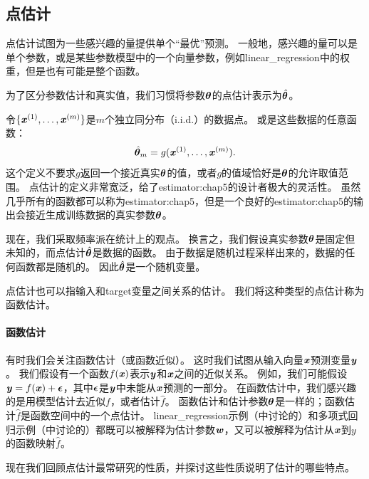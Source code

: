 \subsection{点估计}
\label{sec:point_estimation}
点估计试图为一些感兴趣的量提供单个``最优''预测。
一般地，感兴趣的量可以是单个参数，或是某些参数模型中的一个向量参数，例如\gls{linear_regression}中的权重，但是也有可能是整个函数。

为了区分参数估计和真实值，我们习惯将参数$\boldsymbol{\theta}$的点估计表示为$\hat{\boldsymbol{\theta}}$。

令$\{\boldsymbol{\mathit{x}}^{(1)},\dots,\boldsymbol{\mathit{x}}^{(m)}\}$是$m$个独立同分布（i.i.d.）的数据点。
或是这些数据的任意函数：
\begin{equation}
    \hat{\boldsymbol{\theta}}_m = g(\boldsymbol{\mathit{x}}^{(1)}, \dots, \boldsymbol{\mathit{x}}^{(m)}) .
\end{equation}
这个定义不要求$g$返回一个接近真实$\boldsymbol{\theta}$的值，或者$g$的值域恰好是$\boldsymbol{\theta}$的允许取值范围。
点估计的定义非常宽泛，给了\gls{estimator:chap5}的设计者极大的灵活性。
虽然几乎所有的函数都可以称为\gls{estimator:chap5}，但是一个良好的\gls{estimator:chap5}的输出会接近生成训练数据的真实参数$\boldsymbol{\theta}$。


现在，我们采取频率派在统计上的观点。
换言之，我们假设真实参数$\boldsymbol{\theta}$是固定但未知的，而点估计$\hat{\boldsymbol{\theta}}$是数据的函数。
由于数据是随机过程采样出来的，数据的任何函数都是随机的。
因此$\hat{\boldsymbol{\theta}}$是一个随机变量。


点估计也可以指输入和\gls{target}变量之间关系的估计。
我们将这种类型的点估计称为函数估计。

\paragraph{函数估计} 有时我们会关注函数估计（或函数近似）。
这时我们试图从输入向量$\boldsymbol{\mathit{x}}$预测变量$\boldsymbol{\mathit{y}}$。
我们假设有一个函数$f(\boldsymbol{\mathit{x}})$表示$\boldsymbol{\mathit{y}}$和$\boldsymbol{\mathit{x}}$之间的近似关系。
例如，我们可能假设$\boldsymbol{\mathit{y}} = f(\boldsymbol{\mathit{x}}) + \boldsymbol{\epsilon}$，其中$\boldsymbol{\epsilon}$是$\boldsymbol{\mathit{y}}$中未能从$\boldsymbol{\mathit{x}}$预测的一部分。
在函数估计中，我们感兴趣的是用模型估计去近似$f$，或者估计$\hat{f}$。
函数估计和估计参数$\boldsymbol{\theta}$是一样的；函数估计$\hat{f}$是函数空间中的一个点估计。
\gls{linear_regression}示例（中讨论的）和多项式回归示例（中讨论的）都既可以被解释为估计参数$\boldsymbol{\mathit{w}}$，又可以被解释为估计从$\boldsymbol{\mathit{x}}$到$y$的函数映射$\hat{f}$。

现在我们回顾点估计最常研究的性质，并探讨这些性质说明了估计的哪些特点。

